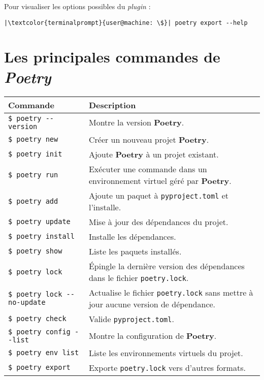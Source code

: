 Pour visualiser les options possibles du \textit{plugin} :
\begin{lstlisting}[style=terminal]
|\textcolor{terminalprompt}{user@machine: \$}| poetry export --help
\end{lstlisting}

\section{Les principales commandes de \textit{Poetry}}

\begin{center}
\begin{table}[h!]
\begin{tabularx}{\textwidth}{|l|X|}
\hline
\textbf{Commande} & \textbf{Description} \\ \hline
\verb|$ poetry --version| & Montre la version \textbf{Poetry}. \\ \hline
\verb|$ poetry new| & Créer un nouveau projet \textbf{Poetry}. \\ \hline
\verb|$ poetry init| & Ajoute \textbf{Poetry} à un projet existant. \\ \hline
\verb|$ poetry run| & Exécuter une commande dans un environnement virtuel géré par \textbf{Poetry}. \\ \hline
\verb|$ poetry add| & Ajoute un paquet à \verb|pyproject.toml| et l'installe. \\ \hline
\verb|$ poetry update| & Mise à jour des dépendances du projet. \\ \hline
\verb|$ poetry install| & Installe les dépendances. \\ \hline
\verb|$ poetry show| & Liste les paquets installés. \\ \hline
\verb|$ poetry lock| & Épingle la dernière version des dépendances dans le fichier \verb|poetry.lock|. \\ \hline
\verb|$ poetry lock --no-update| & Actualise le fichier \verb|poetry.lock| sans mettre à jour aucune version de dépendance. \\ \hline
\verb|$ poetry check| & Valide \verb|pyproject.toml|. \\ \hline
\verb|$ poetry config --list| & Montre la configuration de \textbf{Poetry}. \\ \hline
\verb|$ poetry env list| & Liste les environnements virtuels du projet. \\ \hline
\verb|$ poetry export| & Exporte \verb|poetry.lock| vers d'autres formats. \\ \hline
\end{tabularx}
\end{table}
\end{center}

